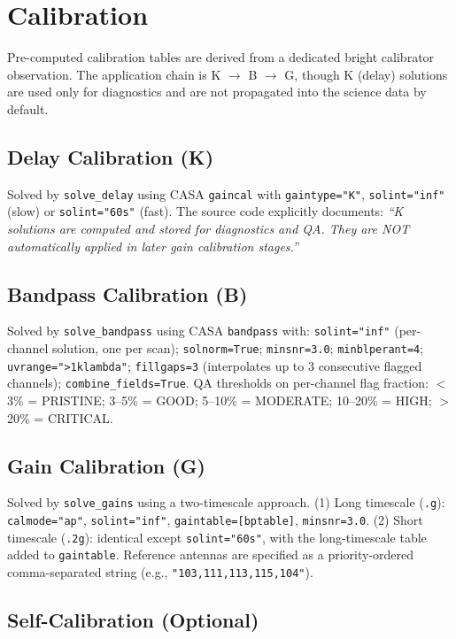 \documentclass[12pt,a4paper]{article}
\begin{document}
\section{Calibration}

Pre-computed calibration tables are derived from a dedicated bright calibrator
observation.  The application chain is K $\to$ B $\to$ G, though K (delay)
solutions are used only for diagnostics and are not propagated into the
science data by default.

\subsection{Delay Calibration (K)}

Solved by \texttt{solve\_delay} using CASA \texttt{gaincal} with
\texttt{gaintype="K"}, \texttt{solint="inf"} (slow) or \texttt{solint="60s"}
(fast).  The source code explicitly documents: \textit{``K solutions are
computed and stored for diagnostics and QA.  They are NOT automatically
applied in later gain calibration stages.''}

\subsection{Bandpass Calibration (B)}

Solved by \texttt{solve\_bandpass} using CASA \texttt{bandpass} with:
\texttt{solint="inf"} (per-channel solution, one per scan);
\texttt{solnorm=True}; \texttt{minsnr=3.0}; \texttt{minblperant=4};
\texttt{uvrange=">1klambda"}; \texttt{fillgaps=3} (interpolates up to
3 consecutive flagged channels); \texttt{combine\_fields=True}.
QA thresholds on per-channel flag fraction:
$<$3\% = PRISTINE; 3--5\% = GOOD; 5--10\% = MODERATE;
10--20\% = HIGH; $>$20\% = CRITICAL.

\subsection{Gain Calibration (G)}

Solved by \texttt{solve\_gains} using a two-timescale approach.
(1) Long timescale (\texttt{.g}): \texttt{calmode="ap"},
\texttt{solint="inf"}, \texttt{gaintable=[bptable]}, \texttt{minsnr=3.0}.
(2) Short timescale (\texttt{.2g}): identical except \texttt{solint="60s"},
with the long-timescale table added to \texttt{gaintable}.
Reference antennas are specified as a priority-ordered comma-separated
string (e.g., \texttt{"103,111,113,115,104"}).

\subsection{Self-Calibration (Optional)}
\end{document}
